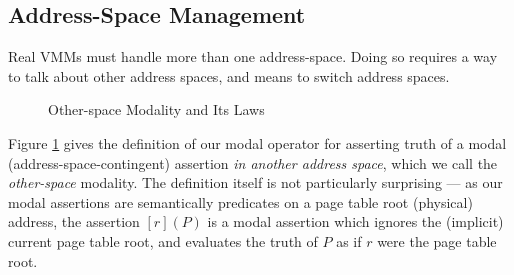 \subsection{Address-Space Management}
\label{sec:aspacemanagement}
Real VMMs must
 handle more than one address-space.
Doing so requires a way to talk about other address spaces, and means to switch address spaces.
\begin{figure}
\footnotesize
{}
\vspace{-1em}
  \caption{Other-space Modality and Its Laws}
  \label{fig:modaldef}
\vspace{-1em}
  \end{figure}
Figure \ref{fig:modaldef} gives the definition of our modal operator for asserting truth of a modal
(address-space-contingent) assertion \emph{in another address space}, which we call
the \emph{other-space} modality. The definition itself is not
particularly surprising --- as our modal assertions are semantically predicates on a page table root (physical)
address, the assertion $[r](P)$ is a modal assertion which ignores the (implicit) current page table root,
and evaluates the truth of $P$ as if $r$ were the page table root. 
